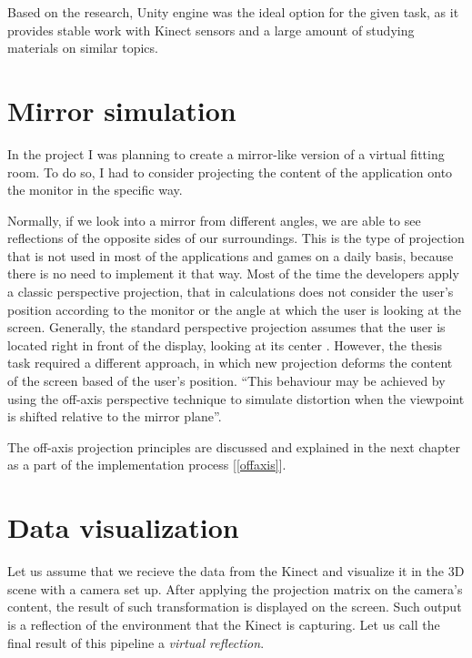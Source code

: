 \documentclass[a4paper]{report}
\begin{document}
\bigskip  Based on the research, Unity engine was the ideal option for the given task, as it provides stable work with Kinect sensors and a large amount of studying materials on similar topics.



\section{Mirror simulation}
\label{section_Camera}
 \qquad In the project I was planning to create a mirror-like version of a virtual fitting room. To do so, I had to consider projecting the content of the application onto the monitor in the specific way. 
 
\bigskip Normally, if we look into a mirror from different angles, we are able to see reflections of the opposite sides of our surroundings. This is the type of projection that is not used in most of the applications and games on a daily basis, because there is no need to implement it that way. Most of the time the developers apply a classic perspective projection, that in calculations does not consider the user's position according to the monitor or the angle at which the user is looking at the screen. Generally, the standard perspective projection assumes that the user is located right in front of the display, looking at its center \cite{offaxisKooima}. However, the thesis task required a different approach, in which new projection deforms the content of the screen based of the user’s position. “This behaviour may be achieved by using the off-axis perspective technique to simulate distortion when the viewpoint is shifted relative to the mirror plane”\cite{offaxisKooima}.

\bigskip The off-axis projection principles are discussed and explained in the next chapter as a part of the implementation process [\ref{offaxis}]. 

\section{Data visualization}

\label{section_Virtual_Ref}
 \qquad Let us assume that we recieve the data from the Kinect and visualize it in the 3D scene with a camera set up. After applying  the projection matrix on the camera’s content, the result of such transformation is displayed on the screen. Such output is a reflection of the environment that the Kinect is capturing. Let us call the final result of this pipeline a \textit{virtual reflection}. 
\end{document}
